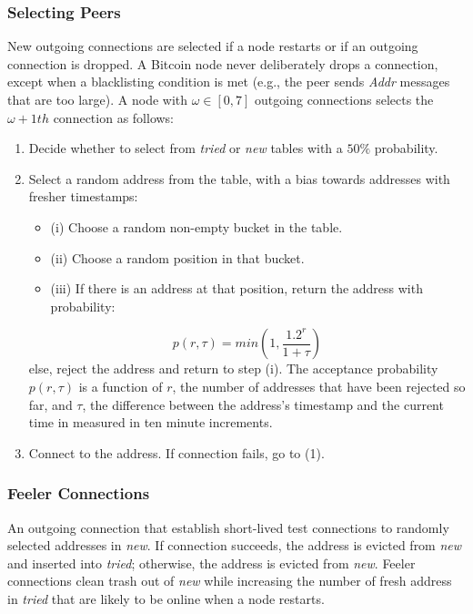 \subsubsection{Selecting Peers}
New outgoing connections are selected if a node restarts or if an outgoing connection is dropped. A Bitcoin node never deliberately drops a connection, except when a blacklisting condition is met (e.g., the peer sends \textsl{Addr} messages that are too large).
A node with $\omega \in [0,7]$ outgoing connections selects the $\omega+1th$ connection as follows:
\begin{enumerate}
  \item Decide whether to select from \emph{tried} or \emph{new} tables with a $50\%$ probability.
  \item Select a random address from the table, with a bias towards addresses with fresher timestamps: 
  \begin{itemize}
      \item (i) Choose a random non-empty bucket in the table.
      \item (ii) Choose a random position in that bucket.
      \item (iii) If there is an address at that position, return the address with probability:
  \end{itemize}  
  \begin{equation}
    p(r, \tau) = min(1, \dfrac{1.2^{r}}{1+\tau})
  \end{equation}
  else, reject the address and return to step (i). The acceptance probability $p(r, \tau)$ is a function of $r$, the number of addresses that have been rejected so far, and $\tau$, the difference between the address’s timestamp and the current time in measured in ten minute increments.
  \item Connect to the address. If connection fails, go to (1).
\end{enumerate}

\subsubsection{Feeler Connections}
An outgoing connection that establish short-lived test connections to randomly selected addresses in \emph{new}. If connection succeeds, the address is evicted from \emph{new} and inserted into \emph{tried}; otherwise, the address is evicted from \emph{new}. Feeler connections clean trash out of \emph{new} while increasing the number of fresh address in \emph{tried} that are likely to be online when a node restarts.

